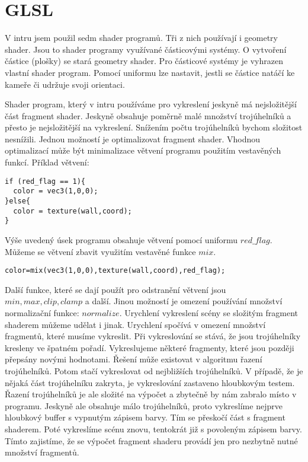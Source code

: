 
\section{GLSL}

V intru jsem použil sedm shader programů.
Tři z nich používají i geometry shader.
Jsou to shader programy využívané částicovými systémy.
O vytvoření částice (plošky) se stará geometry shader.
Pro částicové systémy je vyhrazen vlastní shader program.
Pomocí uniformu lze nastavit, jestli se částice natáčí ke kameře či udržuje svoji orientaci.

Shader program, který v intru používáme pro vykreslení jeskyně má nejsložitější část fragment shader.
Jeskyně obsahuje poměrně malé množství trojúhelníků a přesto je nej\-slo\-ži\-těj\-ší na vykreslení.
Snížením počtu trojúhelníků bychom složitost nesnížili.
Jednou možností je optimalizovat fragment shader.
Vhodnou optimalizací může být minimalizace větvení programu použitím vestavěných funkcí.
Příklad větvení:
\begin{verbatim}
if (red_flag == 1){
  color = vec3(1,0,0);
}else{
  color = texture(wall,coord);
}
\end{verbatim}
Výše uvedený úsek programu obsahuje větvení pomocí uniformu $red\_flag$.
Můžeme se větvení zbavit využitím vestavěné funkce $mix$.
\begin{verbatim}
color=mix(vec3(1,0,0),texture(wall,coord),red_flag);
\end{verbatim}
Další funkce, které se dají použít pro odstranění větvení jsou $min,max,clip,clamp$ a další.
Jinou možností je omezení používání množství normalizační funkce: $normalize$.
Urychlení vykreslení scény se složitým fragment shaderem můžeme udělat i jinak.
Urychlení spočívá v omezení množství fragmentů, které musíme vykreslit.
Při vykreslování se stává, že jsou trojúhelníky kresleny ve špatném pořadí.
Vykreslujeme některé fragmenty, které jsou později přepsány novými hodnotami.
Řešení může existovat v algoritmu řazení trojúhelníků.
Potom stačí vykreslovat od nejbližších trojúhelníků.
V případě, že je nějaká část trojúhelníku zakryta, je vykreslování zastaveno hloubkovým testem.
Řazení trojúhelníků je ale složité na výpočet a zbytečně by nám zabralo místo v programu.
Jeskyně ale obsahuje málo trojúhelníků, proto vykreslíme nejprve hloubkový buffer s vypnutým zápisem barvy.
Tím se přeskočí část s fragment shaderem.
Poté vykreslíme scénu znovu, tentokrát již s povoleným zápisem barvy.
Tímto zajistíme, že se výpočet fragment shaderu provádí jen pro nezbytně nutné množství fragmentů.

